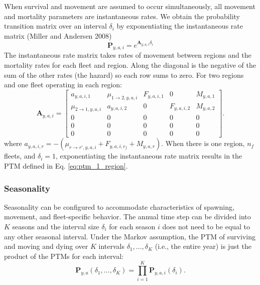 \documentclass[
]{article}
\begin{document}
When survival and movement are assumed to occur simultaneously, all
movement and mortality parameters are instantaneous rates. We obtain the
probability transition matrix over an interval \(\delta_i\) by
exponentiating the instantaneous rate matrix (Miller and Andersen 2008)
\begin{equation*}
\mathbf{P}_{y,a,i} = e^{\mathbf{A}_{y,a,i}\delta_i}
\end{equation*} The instantaneous rate matrix takes rates of movement
between regions and the mortality rates for each fleet and region. Along
the diagonal is the negative of the sum of the other rates (the hazard)
so each row sums to zero. For two regions and one fleet operating in
each region: \begin{equation*}
 \mathbf{A}_{y,a,i} = \begin{bmatrix}
 a_{y,a,i,1} & \mu_{1\rightarrow 2,y,a,i} & F_{y,a,i,1} & 0 & M_{y,a,1} \\
 \mu_{2\rightarrow 1,y,a,i} &  a_{y,a,i,2} & 0 & F_{y,a,i,2} & M_{y,a,2} \\
 0 & 0 & 0 & 0 & 0 \\
 0 & 0 & 0 & 0 & 0 \\
 0 & 0 & 0 & 0 & 0
 \end{bmatrix}.
\end{equation*} where
\(a_{y,a,i,r} = -(\mu_{r\rightarrow r',y,a,i} + F_{y,a,i,r_f} + M_{y,a,r})\).
When there is one region, \(n_f\) fleets, and \(\delta_i = 1\),
exponentiating the instantaneous rate matrix results in the PTM defined
in Eq. \ref{eq:ptm_1_region}.

\hypertarget{seasonality}{%
\subsubsection*{Seasonality}\label{seasonality}}

Seasonality can be configured to accommodate characteristics of
spawning, movement, and fleet-specific behavior. The annual time step
can be divided into \(K\) seasons and the interval size \(\delta_i\) for
each season \(i\) does not need to be equal to any other seasonal
interval. Under the Markov assumption, the PTM of surviving and moving
and dying over \(K\) intervals \(\delta_1,\ldots, \delta_K\) (i.e., the
entire year) is just the product of the PTMs for each interval:
\[ \mathbf{P}_{y,a}(\delta_1,\ldots,\delta_K) = \prod^K_{i=1}\mathbf{P}_{y,a,i}(\delta_i).\]
\end{document}
